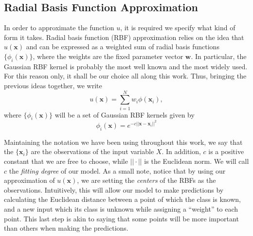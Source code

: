 \documentclass{INGUADY}
\begin{document}
\subsection{Radial Basis Function Approximation}
In order to approximate the function $u$, it is required we specify what kind of form it takes. Radial basis function (RBF) approximation relies on the idea that $u(\mathbf{x})$ and can be expressed as a weighted sum of radial basis functions $\{ \phi_i(\mathbf{x}) \}$, where the weights are the fixed parameter vector $\mathbf{w}$. In particular, the Gaussian RBF kernel is probably the most well known and the most widely used. For this reason only, it shall be our choice all along this work. Thus, bringing the previous ideas together, we write
\begin{equation*}
u(\mathbf{x}) = \sum^N_{i=1} w_i \phi(\mathbf{x}_i),
\end{equation*}
where  $\{ \phi_i(\mathbf{x}) \}$ will be a set of Gaussian RBF kernels given by
\begin{equation*}
\phi_i(\mathbf{x}) = e^{-c|| \mathbf{x} - \mathbf{x}_i ||^2 }
\end{equation*}

Maintaining the notation we have been using throughout this work, we say that the $\{ \mathbf{x}_i \}$ are the observations of the input variable $X$. In addition, $c$ is a positive constant that we are free to choose, while $|| \cdot ||$ is the Euclidean norm. We will call $c$ the \textit{fitting degree} of our model. As a small note, notice that by using our approximation of $u(\mathbf{x})$, we are setting the \textit{centers} of the RBFs as the observations. Intuitively, this will allow our model to make predictions by calculating the Euclidean distance between a point of which the class is known, and a new input which its class is unknown while assigning a ``weight'' to each point. This last step is akin to saying that some points will be more important than others when making the predictions.
\end{document}
